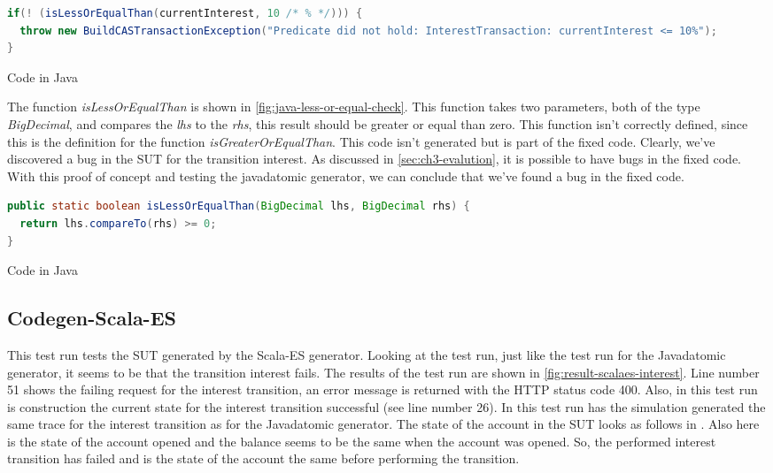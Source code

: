 \begin{sourcecode}[h!]
\begin{lstlisting}[language=Java]
if(! (isLessOrEqualThan(currentInterest, 10 /* % */))) {
  throw new BuildCASTransactionException("Predicate did not hold: InterestTransaction: currentInterest <= 10%");
}
\end{lstlisting}
\caption{Code in Java}
\label{fig:java-gen-interest-pre}
\end{sourcecode}

The function \textit{isLessOrEqualThan} is shown in
\autoref{fig:java-less-or-equal-check}. This function takes two parameters, both
of the type \textit{BigDecimal}, and compares the \textit{lhs} to the
\textit{rhs}, this result should be greater or equal than zero. This function
isn't correctly defined, since this is the definition for the function
\textit{isGreaterOrEqualThan}. This code isn't generated but is part of the
fixed code. Clearly, we've discovered a bug in the SUT for the transition
interest. As discussed in \autoref{sec:ch3-evalution}, it is possible to have
bugs in the fixed code. With this proof of concept and testing the javadatomic
generator, we can conclude that we've found a bug in the fixed code.

\begin{sourcecode}[h!]
\begin{lstlisting}[language=Java]
public static boolean isLessOrEqualThan(BigDecimal lhs, BigDecimal rhs) {
  return lhs.compareTo(rhs) >= 0;
}
\end{lstlisting}
\caption{Code in Java}
\label{fig:java-less-or-equal-check}
\end{sourcecode}

\subsection{Codegen-Scala-ES}
\label{sec:bug-interest-scalaes}

This test run tests the SUT generated by the Scala-ES generator. Looking at the
test run, just like the test run for the Javadatomic generator, it seems to be
that the transition interest fails. The results of the test run are shown in
\autoref{fig:result-scalaes-interest}. Line number 51 shows the failing request
for the interest transition, an error message is returned with the HTTP status
code 400. Also, in this test run is construction the current state for the
interest transition successful (see line number 26). In this test run has the
simulation generated the same trace for the interest transition as for the
Javadatomic generator. The state of the account in the SUT looks as follows in
\label{fig:interest-opened-account-scalaes-json}. Also here is the state of the
account opened and the balance seems to be the same when the account was opened.
So, the performed interest transition has failed and is the state of the account
the same before performing the transition.


